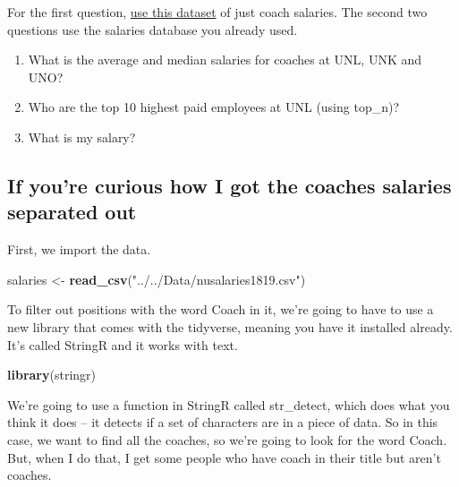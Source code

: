 \documentclass[]{book}
\newenvironment{Shaded}{\begin{snugshade}}{\end{snugshade}}
\newcommand{\KeywordTok}[1]{\textcolor[rgb]{0.13,0.29,0.53}{\textbf{#1}}}
\newcommand{\StringTok}[1]{\textcolor[rgb]{0.31,0.60,0.02}{#1}}
\newcommand{\OperatorTok}[1]{\textcolor[rgb]{0.81,0.36,0.00}{\textbf{#1}}}
\newcommand{\NormalTok}[1]{#1}
\providecommand{\tightlist}{%
  \setlength{\itemsep}{0pt}\setlength{\parskip}{0pt}}
\begin{document}
For the first question,
\href{https://www.dropbox.com/s/iodsuouf39blbbz/coaches.csv?dl=0}{use
this dataset} of just coach salaries. The second two questions use the
salaries database you already used.

\begin{enumerate}
\def\labelenumi{\arabic{enumi}.}
\tightlist
\item
  What is the average and median salaries for coaches at UNL, UNK and
  UNO?
\item
  Who are the top 10 highest paid employees at UNL (using top\_n)?
\item
  What is my salary?
\end{enumerate}

\subsection{If you're curious how I got the coaches salaries separated
out}\label{if-youre-curious-how-i-got-the-coaches-salaries-separated-out}

First, we import the data.

\begin{Shaded}
\begin{Highlighting}[]
\NormalTok{salaries <-}\StringTok{ }\KeywordTok{read_csv}\NormalTok{(}\StringTok{"../../Data/nusalaries1819.csv"}\NormalTok{)}
\end{Highlighting}
\end{Shaded}

To filter out positions with the word Coach in it, we're going to have
to use a new library that comes with the tidyverse, meaning you have it
installed already. It's called StringR and it works with text.

\begin{Shaded}
\begin{Highlighting}[]
\KeywordTok{library}\NormalTok{(stringr)}
\end{Highlighting}
\end{Shaded}

We're going to use a function in StringR called str\_detect, which does
what you think it does -- it detects if a set of characters are in a
piece of data. So in this case, we want to find all the coaches, so
we're going to look for the word Coach. But, when I do that, I get some
people who have coach in their title but aren't coaches.

\begin{Shaded}
\end{Shaded}
\end{document}
